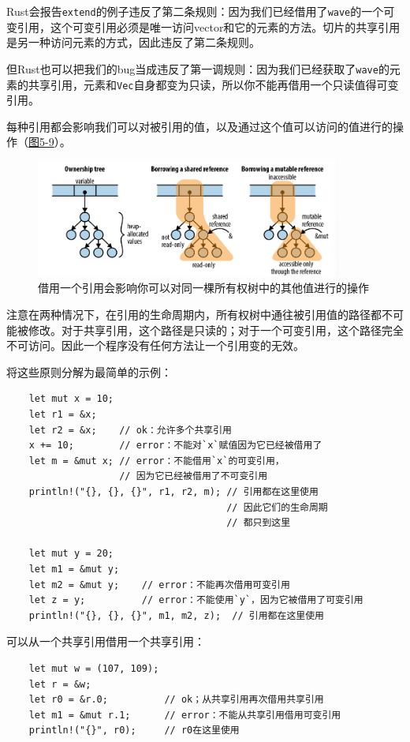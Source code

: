 Rust会报告\texttt{extend}的例子违反了第二条规则：因为我们已经借用了\texttt{wave}的一个可变引用，这个可变引用必须是唯一访问vector和它的元素的方法。切片的共享引用是另一种访问元素的方式，因此违反了第二条规则。

但Rust也可以把我们的bug当成违反了第一调规则：因为我们已经获取了\texttt{wave}的元素的共享引用，元素和\texttt{Vec}自身都变为只读，所以你不能再借用一个只读值得可变引用。

每种引用都会影响我们可以对被引用的值，以及通过这个值可以访问的值进行的操作（\hyperref[f5-9]{图5-9}）。

\begin{figure}[htbp]
    \centering
    \includegraphics[width=0.9\textwidth]{../img/f5-9.png}
    \caption{借用一个引用会影响你可以对同一棵所有权树中的其他值进行的操作}
    \label{f5-9}
\end{figure}

注意在两种情况下，在引用的生命周期内，所有权树中通往被引用值的路径都不可能被修改。对于共享引用，这个路径是只读的；对于一个可变引用，这个路径完全不可访问。因此一个程序没有任何方法让一个引用变的无效。

将这些原则分解为最简单的示例：
\begin{verbatim}
    let mut x = 10;
    let r1 = &x;
    let r2 = &x;    // ok：允许多个共享引用
    x += 10;        // error：不能对`x`赋值因为它已经被借用了
    let m = &mut x; // error：不能借用`x`的可变引用，
                    // 因为它已经被借用了不可变引用
    println!("{}, {}, {}", r1, r2, m); // 引用都在这里使用
                                       // 因此它们的生命周期
                                       // 都只到这里

    let mut y = 20;
    let m1 = &mut y;
    let m2 = &mut y;    // error：不能再次借用可变引用
    let z = y;          // error：不能使用`y`，因为它被借用了可变引用
    println!("{}, {}, {}", m1, m2, z);  // 引用都在这里使用
\end{verbatim}

可以从一个共享引用借用一个共享引用：
\begin{verbatim}
    let mut w = (107, 109);
    let r = &w;
    let r0 = &r.0;          // ok；从共享引用再次借用共享引用
    let m1 = &mut r.1;      // error：不能从共享引用借用可变引用
    println!("{}", r0);     // r0在这里使用
\end{verbatim}

